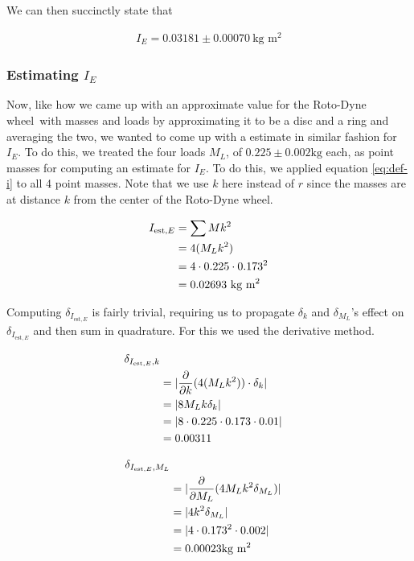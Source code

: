 \documentclass[coverpage]{article}
\newcommand{\iUnit}{\text{kg $\text{m}^2$}}
\newcommand{\rwheel}{Roto-Dyne wheel}
\begin{document}
	We can then succinctly state that
	
	\begin{align}
		I_E = 0.03181 \pm 0.00070\ \iUnit \label{eq:def-ie}
	\end{align}

	\subsubsection{Estimating $I_E$}
	
	Now, like how we came up with an approximate value for the \rwheel~with masses and loads by approximating it to be a disc and a ring and averaging the two, we wanted to come up with a estimate in similar fashion for $I_E$. To do this, we treated the four loads $M_L$, of $0.225 \pm 0.002 \text{kg}$ each, as point masses for computing an estimate for $I_E$. To do this, we applied equation \ref{eq:def-i} to all 4 point masses. Note that we use $k$ here instead of $r$ since the masses are at distance $k$ from the center of the \rwheel.
	
	\begin{align}
		I_{\text{est}, E} &= \sum{M k^2} \notag \\
		&= 4 (M_L k^2) \notag \\
		&= 4 \cdot 0.225 \cdot 0.173^2 \notag \\
		&= 0.02693\ \iUnit
	\end{align}
	
	Computing $\delta_{I_{\text{est}, E}}$ is fairly trivial, requiring us to propagate $\delta_k$ and $\delta_{M_L}$'s effect on $\delta_{I_{\text{est}, E}}$ and then sum in quadrature. For this we used the derivative method.
	
	\begin{align}
		\delta_{I_{\text{est}, E}, k} \notag \\
		&= |\frac{\partial}{\partial k} (4 (M_L k^2)) \cdot \delta_k| \notag \\
		&= |8 M_L k \delta_k| \notag \\
		&= |8 \cdot 0.225 \cdot 0.173 \cdot 0.01| \notag \\
		&= 0.00311
	\end{align}
	
	\begin{align}
		\delta_{I_{\text{est}, E}, M_L} \notag \\
		&= |\frac{\partial}{\partial M_L} (4 M_L k^2 \delta_{M_L})| \notag \\
		&= |4 k^2 \delta_{M_L}| \notag \\
		&= |4 \cdot 0.173^2 \cdot 0.002| \notag \\
		&= 0.00023 \iUnit
	\end{align}
	
\end{document}
